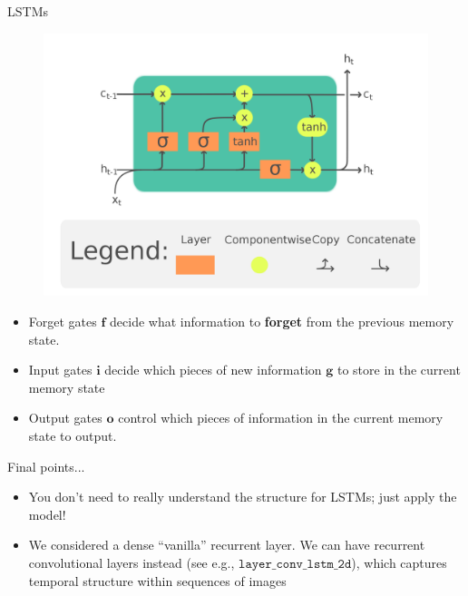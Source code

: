 \documentclass{beamer}
\begin{document}
\begin{frame}{LSTMs}
\begin{figure}
\includegraphics[width=0.5\linewidth]{Images/LSTM_Cell.png}
\end{figure}
\begin{itemize}
\item Forget gates  $\mathbf{f}$ decide what information to \textbf{forget} from the previous memory state.
\item Input gates $\mathbf{i}$ decide which pieces of new information $\mathbf{g}$ to store in the current memory state 
\item Output gates $\mathbf{o}$ control which pieces of information in the current memory state to output. 
\end{itemize}
\end{frame}



\begin{frame}{Final points...}
\begin{itemize}
\item You don't need to really understand the structure for LSTMs; just apply the model!
\item We considered a dense ``vanilla'' recurrent layer. We can have recurrent convolutional layers instead (see e.g., $\texttt{layer\_conv\_lstm\_2d}$), which captures temporal structure within sequences of images
\end{itemize}
\end{frame}
\end{document}
